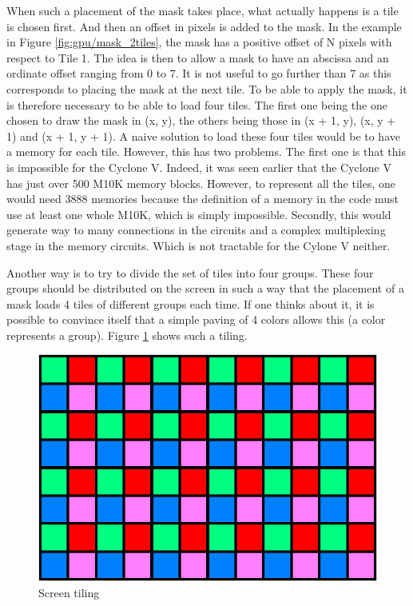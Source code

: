 When such a placement of the mask takes place, what actually happens is a tile is chosen first. And 
then an offset in pixels is added to the mask. In the example in Figure \ref{fig:gpu/mask_2tiles}, 
the mask has a positive 
offset of N pixels with respect to Tile 1. The idea is then to allow a mask to have an abscissa and
an ordinate offset ranging from 0 to 7. It is not useful to go further than 7 
as this corresponds to placing the mask at the next tile. To be able to apply the mask, it is 
therefore necessary to be able to load four tiles. The first one being the one chosen to draw the 
mask in (x, y), the others being those in (x + 1, y), (x, y + 1) and (x + 1, y + 1). A naive 
solution to load these four tiles would be to have a memory for each tile. However, this has two 
problems. The first one is that this is impossible for the Cyclone V. Indeed, it was seen earlier that 
the Cyclone V has just over 500 M10K memory blocks. However, to represent all the tiles, one would 
need 3888 memories because the definition of a memory in the code must use at least one whole M10K, 
which is simply impossible. Secondly, this would generate way to many connections in the circuits
and a complex multiplexing stage in the memory circuits. Which is not tractable for the Cylone V 
neither.

Another way is to try to divide the set of tiles into four groups. These four groups should be 
distributed on the screen in such a way that the placement of a mask loads 4 tiles of different 
groups each time. If one thinks about it, it is possible to convince itself that a simple paving 
of 4 colors allows this (a color represents a group). Figure \ref{fig:gpu/screen_tiling} shows such 
a tiling. 

\begin{figure}[H]
    \centering
    \includegraphics[scale=1.0]{Chapter4-GPU_CLKU/res/screen_tiling}
    \caption{Screen tiling}
    \label{fig:gpu/screen_tiling}
\end{figure}

